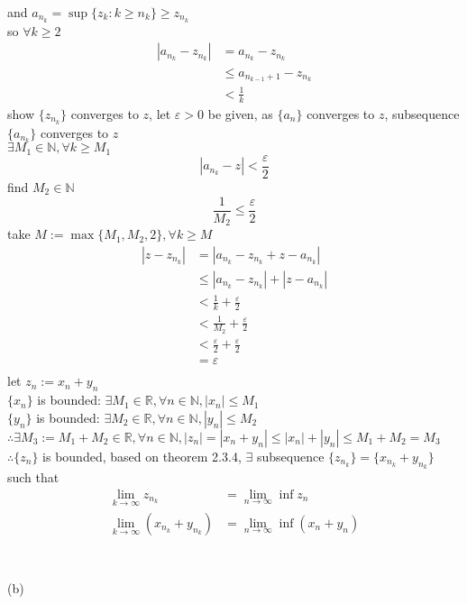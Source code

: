 \documentclass[12pt, border = 4pt, multi]{article} %
\begin{document}
and $a_{n_k} = \sup\{z_k: k \geq n_k\} \geq z_{n_k}$\\
so $\forall k \geq 2$
\begin{align*}
|a_{n_k} - z_{n_k}| &= a_{n_k} - z_{n_k}\\
&\leq a_{n_{k - 1} + 1} - z_{n_k}\\
&< \frac{1}{k}
\end{align*}
show $\{z_{n_k}\}$ converges to $z$, let $\varepsilon > 0$ be given, as $\{a_n\}$ converges to $z$, subsequence $\{a_{n_k}\}$ converges to $z$\\
$\exists M_1 \in \mathbb{N}, \forall k \geq M_1$
\[|a_{n_k} - z| < \frac{\varepsilon}{2}\]
find $M_2 \in \mathbb{N}$
\[\frac{1}{M_2} \leq \frac{\varepsilon}{2}\]
take $M := \max\{M_1, M_2, 2\}, \forall k \geq M$
\begin{align*}
|z - z_{n_k}| &= |a_{n_k} - z_{n_k} + z - a_{n_k}|\\
&\leq |a_{n_k} - z_{n_k}| + |z - a_{n_k}|\\
&< \frac{1}{k} + \frac{\varepsilon}{2}\\
&< \frac{1}{M_2} + \frac{\varepsilon}{2}\\
&< \frac{\varepsilon}{2} + \frac{\varepsilon}{2}\\
&= \varepsilon\\
\end{align*}
let $z_n := x_n + y_n$\\
$\{x_n\}$ is bounded: $\exists M_1 \in \mathbb{R}, \forall n \in \mathbb{N}, |x_n| \leq M_1$\\
$\{y_n\}$ is bounded: $\exists M_2 \in \mathbb{R}, \forall n \in \mathbb{N}, |y_n| \leq M_2$\\
$\therefore \exists M_3 := M_1 + M_2 \in \mathbb{R}, \forall n \in \mathbb{N}, |z_n| = |x_n + y_n| \leq |x_n| + |y_n| \leq M_1 + M_2 = M_3$\\
$\therefore \{z_n\}$ is bounded, based on theorem 2.3.4, $\exists$ subsequence $\{z_{n_k}\} = \{x_{n_k} + y_{n_k}\}$ such that
\begin{align*}
\lim_{k \rightarrow \infty} z_{n_k} &= \lim_{n \rightarrow \infty} \inf z_n\\
\lim_{k \rightarrow \infty} (x_{n_k} + y_{n_k}) &= \lim_{n \rightarrow \infty} \inf (x_n + y_n)\\
\end{align*}
\\
\\
(b)
\end{document}
